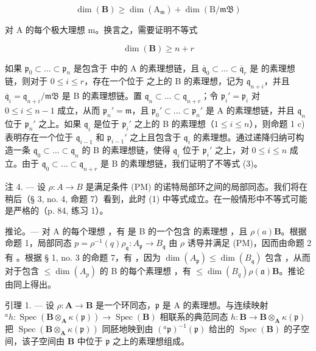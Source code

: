 \[
\dim (\mathbf {B}) \geqslant \dim (\mathrm{A} _ {\mathfrak {m}}) + \dim (\mathrm{B} / \mathfrak {m B})\tag{2}
\]

对 A 的每个极大理想 m。换言之，需要证明不等式

\[
\dim (\mathbf {B}) \geqslant n + r\tag{3}
\]

如果 \(\mathfrak{p}_0\subset \ldots \subset \mathfrak{p}_n\) 是包含于  中的 A 的素理想链，且 \(\overline{\mathfrak{q}}_0\subset \ldots \subset \overline{\mathfrak{q}}_r\) 是  的素理想链，则对于 \(0\leqslant i\leqslant r\)，存在一个位于  之上的 B 的素理想，记为 \(\mathfrak{q}_{n+i}\)，并且 \(\overline{\mathfrak{q}}_i = \mathfrak{q}_{n + i} / \mathfrak{mB}\) 是 B 的素理想链。置 \(\mathfrak{q}_n\subset \ldots \subset \mathfrak{q}_{n + r}\)；令 \(\mathfrak{p}_i' = \mathfrak{p}_i\) 对 \(0\leqslant i\leqslant n-1\) 成立，从而 \(\mathfrak{p}_n' = \mathfrak m\)，且 \(\mathfrak{p}_0'\subset \ldots \subset \mathfrak{p}_n'\) 是 A 的素理想链，并且 \(\mathfrak{q}_n\) 位于 \(\mathfrak{p}_n'\) 之上。如果 \(\mathfrak{q}_i\) 是位于 \(\mathfrak{p}_i'\) 之上的 B 的素理想（\(1\leqslant i\leqslant n\)），则命题 1 c) 表明存在一个位于 \(\mathfrak{q}_{i-1}\) 和 \(\mathfrak{p}_{i-1}'\) 之上且包含于 \(\mathfrak{q}_i\) 的素理想。通过递降归纳可构造一条 \(\mathfrak{q}_0\subset \ldots \subset \mathfrak{q}_n\) 的 B 的素理想链，使得 \(\mathfrak{q}_i\) 位于 \(\mathfrak{p}_i'\) 之上，对 \(0\leqslant i\leqslant n\) 成立。由于 \(\mathfrak{q}_0\subset \ldots \subset \mathfrak{q}_{n+r}\) 是 B 的素理想链，我们证明了不等式 (3)。

注 4. --- 设 \(\rho: A \to B\) 是满足条件 (PM) 的诺特局部环之间的局部同态。我们将在稍后（§ 3, no. 4, 命题 7）看到，此时 (1) 中等式成立。在一般情形中不等式可能是严格的（p. 84, 练习 1）。

推论。--- 对 A 的每个理想  ，有
是 B 的一个包含  的素理想
，且 \(\rho(a)\mathbf{B}\)。根据命题 1，局部同态 \(p = \rho^{-1}(q)\)\(\rho_{\mathfrak{q}}: A_{\mathfrak{p}} \to B_{\mathfrak{q}}\) 由 \(\rho\) 诱导并满足 (PM)，因而由命题 2 有  。根据 § 1, no. 3 的命题 7，有  ，因为 \(\dim(A_{\mathfrak{p}}) \leqslant \dim(B_{\mathfrak{q}})\) 包含  ，从而对于包含 \(\leqslant \dim(A_p)\) 的 B 的每个素理想  ，有 \(\leqslant \dim(B_q)\)\(\rho(\mathfrak{a})\mathbf{B}\)。推论由同上得出。

引理 1. — 设 \(\rho: \mathbf{A} \to \mathbf{B}\) 是一个环同态，\(\mathfrak{p}\) 是 A 的素理想。与连续映射 \(^{a}h: \operatorname{Spec}(\mathbf{B} \otimes_{\mathbf{A}} \kappa(\mathfrak{p})) \to \operatorname{Spec}(\mathbf{B})\) 相联系的典范同态 \(h:\mathbf{B}\to\mathbf{B}\otimes_{\mathbf{A}}\kappa(\mathfrak{p})\) 把 \(\operatorname{Spec}(\mathbf{B}\otimes_{\mathbf{A}}\kappa(\mathfrak{p}))\) 同胚地映到由 \((^{a}\mathfrak{p})^{-1}(\mathfrak{p})\) 给出的 \(\operatorname{Spec}(\mathbf{B})\) 的子空间，该子空间由 \(\mathbf{B}\) 中位于 \(\mathfrak{p}\) 之上的素理想组成。

